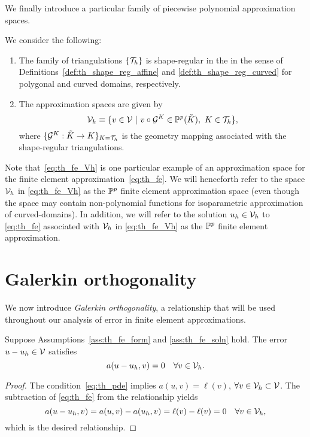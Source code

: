 We finally introduce a particular family of piecewise polynomial approximation spaces.
\begin{assumption}
  \label{ass:th_fe_Vh}
  We consider the following:
  \begin{enumerate}
  \item The family of triangulations $\{ \mathcal{T}_h \}$ is shape-regular in the in the sense of Definitions~\ref{def:th_shape_reg_affine} and \ref{def:th_shape_reg_curved} for polygonal and curved domains, respectively.
  \item The approximation spaces are given by 
  \begin{equation}
    \mathcal{V}_h \equiv \{ v \in \mathcal{V} \ | \ v \circ \mathcal{G}^K \in \mathbb{P}^p(\tilde K), \ K \in \mathcal{T}_h \},
    \label{eq:th_fe_Vh}
  \end{equation}
  where $\{ \mathcal{G}^K: \tilde K \to K \}_{K = \mathcal{T}_h}$ is the geometry mapping associated with the shape-regular triangulations.
  \end{enumerate}
  \end{assumption}
  Note that~\eqref{eq:th_fe_Vh} is one particular example of an approximation space for the finite element approximation~\eqref{eq:th_fe}.  We will henceforth refer to the space $\mathcal{V}_h$ in \eqref{eq:th_fe_Vh} as the $\mathbb{P}^p$ finite element approximation space (even though the space may contain non-polynomial functions for isoparametric approximation of curved-domains). In addition, we will refer to the solution $u_h \in \mathcal{V}_h$ to \eqref{eq:th_fe} associated with $\mathcal{V}_h$ in \eqref{eq:th_fe_Vh} as the $\mathbb{P}^p$ finite element approximation.  

\section{Galerkin orthogonality}
We now introduce \emph{Galerkin orthogonality}, a relationship that will be used throughout our analysis of error in finite element approximations.
\begin{lemma}
  Suppose Assumptions~\ref{ass:th_fe_form} and \ref{ass:th_fe_soln} hold. The error $u - u_h \in \mathcal{V}$ satisfies 
  \begin{equation*}
    a(u - u_h, v) = 0 \quad \forall v \in \mathcal{V}_h.
  \end{equation*}
  \begin{proof}
    The condition~\eqref{eq:th_pde} implies $a(u,v) = \ell(v)$, $\forall v \in \mathcal{V}_h \subset \mathcal{V}$.  The subtraction of \eqref{eq:th_fe} from the relationship yields
    \begin{equation*}
      a(u - u_h, v) = a(u,v) - a(u_h,v) = \ell(v) - \ell(v) = 0 \quad \forall v \in \mathcal{V}_h,
    \end{equation*}
    which is the desired relationship.
  \end{proof}
\end{lemma}

